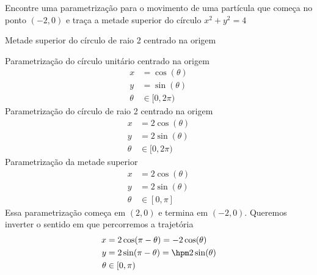 \documentclass[a4paper,12pt,fleqn]{article}
\begin{document}

Encontre uma parametrização para o movimento de uma partícula que começa no
ponto \((-2, 0)\) e traça a metade superior do círculo \(x^2+y^2=4\)
\clearpagequestiononly

\begin{answer}
  Metade superior do círculo de raio 2 centrado na origem

  Parametrização do círculo unitário centrado na origem
  \begin{align*}
    x      & = \cos(\theta) \\
    y      & = \sin(\theta) \\
    \theta & \in [0, 2\pi)
  \end{align*}
  Parametrização do círculo de raio 2 centrado na origem
  \begin{align*}
    x      & = 2\cos(\theta) \\
    y      & = 2\sin(\theta) \\
    \theta & \in [0, 2\pi)
  \end{align*}
  Parametrização da metade superior
  \begin{align*}
    x      & = 2\cos(\theta) \\
    y      & = 2\sin(\theta) \\
    \theta & \in [0, \pi]
  \end{align*}
  Essa parametrização começa em \((2, 0)\) e termina em \((-2, 0)\).
  Queremos inverter o sentido em que percorremos a trajetória
  \begin{align*}
    x      & = 2\cos(\pi -\theta) =    - 2 \cos(\theta)\\
    y      & = 2\sin(\pi -\theta) = \hpm 2 \sin(\theta)\\
    \theta & \in [0, \pi)
  \end{align*}
\end{answer}
\end{document}
